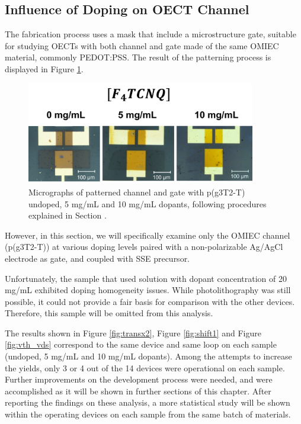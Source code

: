 
\subsection{Influence of Doping on OECT Channel}
The fabrication process uses a mask that include a microstructure gate, suitable for studying OECTs with both channel and gate made of the same OMIEC material, commonly PEDOT:PSS. The result of the patterning process is displayed in Figure \ref{fig:channel}. 

\begin{figure}[ht]
  \centering
  \includegraphics[width=10cm]{Images/pdf/BigGateDevices.pdf}
  \caption[Micrographs of a patterned channel and gate p(g3T2-T) at different doping levels]{Micrographs of patterned channel and gate with p(g3T2-T) undoped, 5 mg/mL and 10 mg/mL dopants, following procedures explained in Section \label{subsec:photo}.}
  \label{fig:channel}
\end{figure}

However, in this section, we will specifically examine only the OMIEC channel (p(g3T2-T)) at various doping levels paired with a non-polarizable Ag/AgCl electrode as gate, and coupled with SSE precursor.

Unfortunately, the sample that used solution with dopant concentration of 20 mg/mL exhibited doping homogeneity issues. While photolithography was still possible, it could not provide a fair basis for comparison with the other devices. Therefore, this sample will be omitted from this analysis.

The results shown in Figure \ref{fig:transx2}, Figure \ref{fig:shift1} and Figure \ref{fig:vth_vds} correspond to the same device and same loop on each sample (undoped, 5 mg/mL and 10 mg/mL dopants). Among the attempts to increase the yields, only 3 or 4 out of the 14 devices were operational on each sample. Further improvements on the development process were needed, and were accomplished as it will be shown in further sections of this chapter. After reporting the findings on these analysis, a more statistical study will be shown within the operating devices on each sample from the same batch of materials.

